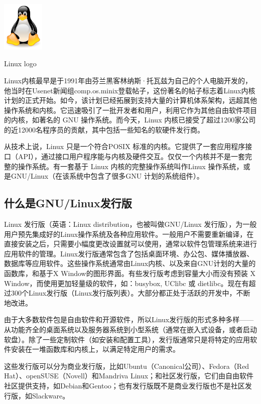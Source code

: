 \documentclass[UTF8]{ctexart}
\begin{document}
\par
\begin{center}
\includegraphics[width=0.15\textwidth]{tux.png}
\par
Linux logo
\end{center}
\par
Linux内核最早是于1991年由芬兰黑客林纳斯·托瓦兹为自己的个人电脑开发的，他当时在Usenet新闻组comp.os.minix登载帖子，这份著名的帖子标志着Linux内核计划的正式开始。如今，该计划已经拓展到支持大量的计算机体系架构，远超其他操作系统和内核。它迅速吸引了一批开发者和用户，利用它作为其他自由软件项目的内核，如著名的 GNU 操作系统。而今天，Linux 内核已接受了超过1200家公司的近12000名程序员的贡献，其中包括一些知名的软硬件发行商。

从技术上说，Linux 只是一个符合POSIX 标准的内核。它提供了一套应用程序接口（API），通过接口用户程序能与内核及硬件交互。仅仅一个内核并不是一套完整的操作系统。有一套基于 Linux 内核的完整操作系统叫作Linux 操作系统，或是GNU/Linux（在该系统中包含了很多GNU 计划的系统组件）。

\subsection{\msyh 什么是GNU/Linux发行版}
Linux 发行版（英语：Linux distribution，也被叫做GNU/Linux 发行版），为一般用户预先集成好的Linux操作系统及各种应用软件。一般用户不需要重新编译，在直接安装之后，只需要小幅度更改设置就可以使用，通常以软件包管理系统来进行应用软件的管理。Linux发行版通常包含了包括桌面环境、办公包、媒体播放器、数据库等应用软件。这些操作系统通常由Linux内核、以及来自GNU计划的大量的函数库，和基于X Window的图形界面。有些发行版考虑到容量大小而没有预装 X Window，而使用更加轻量级的软件，如：busybox, UClibc 或 dietlibc。现在有超过300个Linux发行版（Linux发行版列表）。大部分都正处于活跃的开发中，不断地改进。
\par

由于大多数软件包是自由软件和开源软件，所以Linux发行版的形式多种多样——从功能齐全的桌面系统以及服务器系统到小型系统（通常在嵌入式设备，或者启动软盘）。除了一些定制软件（如安装和配置工具），发行版通常只是将特定的应用软件安装在一堆函数库和内核上，以满足特定用户的需求。

\par
这些发行版可以分为商业发行版，比如Ubuntu（Canonical公司）、Fedora（Red Hat）、openSUSE（Novell）和Mandriva Linux；和社区发行版，它们由自由软件社区提供支持，如Debian和Gentoo；也有发行版既不是商业发行版也不是社区发行版，如Slackware。
\newpage
\par
\par
\end{document}
